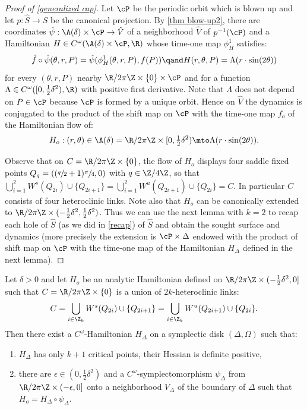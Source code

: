 \begin{proof}[Proof of \cref{generalized cap}]
Let $\cP$ be the periodic orbit which is blown up and let $p: \hat S\to S$ be the canonical projection. By \cref{thm blow-up2}, there are coordinates $\hat \psi: \A(\delta)\times\nobreak \cP \to \hat V$ of a neighborhood $\hat V$ of $p^{-1}(\cP)$ and a Hamiltonian $H\in C^\omega (\A(\delta)\times\nobreak \cP, \R)$ whose time-one map $\phi_H^1$ satisfies:
\[\hat f \circ \hat \psi (\theta, r,P) = \hat \psi(\phi_H^1(\theta,r,P), f(P)) \qand H (r,\theta,P)= \Lambda (r \cdot \sin(2\theta)) \]
for every $(\theta,r,P)$ nearby $\R/2\pi \Z\times \{0\}\times \cP$
and for a function $\Lambda\in C^\omega([0,\tfrac12 \delta^2),\R)$ with positive first derivative.
Note that $\Lambda$ does not depend on $P \in \cP$ because $\cP$ is formed by a unique orbit.
Hence on $\hat V$ the dynamics is conjugated to the product of the shift map on $\cP$ with the time-one map $f_o$ of the Hamiltonian flow of:
\[H_o: (r,\theta)\in \A(\delta)=\R/2\pi\Z\times [0,\tfrac12 \delta^2)\mto \Lambda (r \cdot \sin(2\theta)). \]

Observe that on $C= \R/2\pi\Z\times \{0\}$, the flow of $H_o$ displays four saddle fixed points $Q_q=((\sfrac q 2+1)\sfrac\pi4,0)$ with $q\in \Z/4\Z$, so that $ \bigcup_{i=1}^2 W^s(Q_{2i})\cup \{Q_{2i+1}\} =
\bigcup_{i=1}^2 W^u(Q_{2i+1})\cup \{Q_{2i}\}= C$.
In particular $C$ consists of four heteroclinic links. Note also that $H_o$ can be canonically extended to $\R/2\pi \Z\times (-\tfrac12 \delta^2,\tfrac12 \delta^2)$. Thus we can use the next lemma with $k=2$ to recap each hole of $\hat S$ (as we did in \cref{recap}) of $\hat S $ and obtain the sought surface and dynamics (more precisely the extension is $ \cP\times\Delta$ endowed with the product of shift map on $\cP$ with the time-one map of the Hamiltonian $H_\Delta$ defined in the next lemma). \end{proof}

\begin{lemma}\label{fonda3}\label{Generalized cap}
Let $\delta>0$ and let $H_o$ be an analytic Hamiltonian defined on $ \R/2\pi\Z\times (-\tfrac12 \delta^2,0]$ such that $C=\R/2\pi\Z\times \{0\} $ is a union of $2k$-heteroclinic links:
\[C= \bigcup_{i\in \Z_k} W^s(Q_{2i}) \cup \{Q_{2i+1}\}= \bigcup_{i\in \Z_k} W^u(Q_{2i+1}) \cup \{Q_{2i}\}.\]
Then there exist a $C^\omega$-Hamiltonian $H_\Delta$ on a symplectic disk $(\Delta,\Omega) $ such that:
\begin{enumerate}
\item $H_\Delta$ has only $k+1$ critical points, their Hessian is definite positive,
\item there are $\epsilon\in (0,\tfrac12 \delta^2)$ and a $C^\omega$-symplectomorphism $ \psi_\Delta$ from $ \R/2\pi\Z \times (-\epsilon,0]$ onto a neighborhood $V_\Delta$ of the boundary of $\Delta$
such that $H_o= H_\Delta\circ \psi_\Delta$.
\end{enumerate}
\end{lemma}

